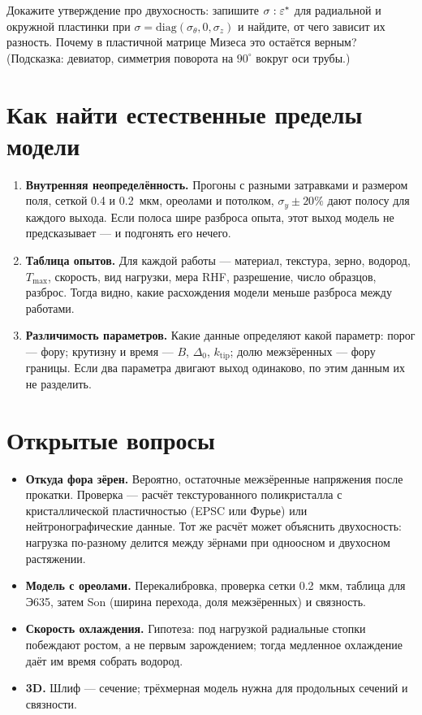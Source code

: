 \begin{exercise}
Докажите утверждение про двухосность: запишите $\sigma:\varepsilon^*$ для радиальной и окружной
пластинки при $\sigma=\mathrm{diag}(\sigma_\theta,0,\sigma_z)$ и найдите, от чего зависит их разность.
Почему в пластичной матрице Мизеса это остаётся верным? (Подсказка: девиатор, симметрия
поворота на $90^\circ$ вокруг оси трубы.)
\end{exercise}

\section{Как найти естественные пределы модели}

\begin{enumerate}
\item \textbf{Внутренняя неопределённость.} Прогоны с разными затравками и размером поля, сеткой
  0.4 и 0.2~мкм, ореолами и потолком, $\sigma_y\pm20\%$ дают полосу для каждого выхода. Если полоса
  шире разброса опыта, этот выход модель не предсказывает --- и подгонять его нечего.
\item \textbf{Таблица опытов.} Для каждой работы --- материал, текстура, зерно, водород, $T_{\max}$,
  скорость, вид нагрузки, мера RHF, разрешение, число образцов, разброс. Тогда видно, какие
  расхождения модели меньше разброса между работами.
\item \textbf{Различимость параметров.} Какие данные определяют какой параметр: порог ---
  фору; крутизну и время --- $B$, $\Delta_0$, $k_{\text{tip}}$; долю межзёренных --- фору границы.
  Если два параметра двигают выход одинаково, по этим данным их не разделить.
\end{enumerate}

\section{Открытые вопросы}

\begin{itemize}
\item \textbf{Откуда фора зёрен.} Вероятно, остаточные межзёренные напряжения после прокатки.
  Проверка --- расчёт текстурованного поликристалла с кристаллической пластичностью (EPSC или
  Фурье) или нейтронографические данные. Тот же расчёт может объяснить двухосность: нагрузка по-разному
  делится между зёрнами при одноосном и двухосном растяжении.
\item \textbf{Модель с ореолами.} Перекалибровка, проверка сетки 0.2~мкм, таблица для Э635,
  затем Son (ширина перехода, доля межзёренных) и связность.
\item \textbf{Скорость охлаждения.} Гипотеза: под нагрузкой радиальные стопки побеждают ростом, а
  не первым зарождением; тогда медленное охлаждение даёт им время собрать водород.
\item \textbf{3D.} Шлиф --- сечение; трёхмерная модель нужна для продольных сечений и связности.
\end{itemize}

